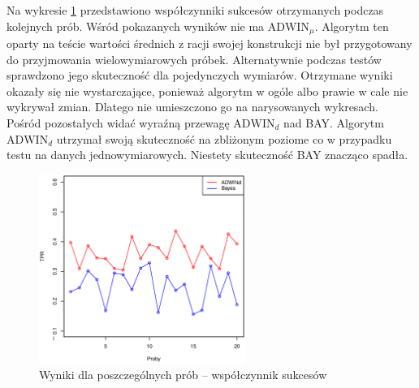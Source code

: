 Na wykresie \ref{fig:CovValuesResTpr} przedstawiono współczynniki sukcesów otrzymanych podczas kolejnych prób.
Wśród pokazanych wyników nie ma $\mbox{ADWIN}_\mu$.
Algorytm ten oparty na teście wartości średnich z racji swojej konstrukcji nie był przygotowany do przyjmowania wielowymiarowych próbek.
Alternatywnie podczas testów sprawdzono jego skuteczność dla pojedynczych wymiarów.
Otrzymane wyniki okazały się nie wystarczające, ponieważ algorytm w ogóle albo prawie w cale nie wykrywał zmian.
Dlatego nie umieszczono go na narysowanych wykresach.
Pośród pozostałych widać wyraźną przewagę $\mbox{ADWIN}_d$ nad BAY.
Algorytm $\mbox{ADWIN}_d$ utrzymał swoją skuteczność na zbliżonym poziome co w przypadku testu na danych jednowymiarowych.
Niestety skuteczność BAY znacząco spadła.
\begin{figure}[htbp]
  \centering
  \includegraphics[width=0.6\textwidth]{img/ch-5-cov-res-tpr}
  \caption{Wyniki dla poszczególnych prób -- współczynnik sukcesów}
  \label{fig:CovValuesResTpr}
\end{figure}

